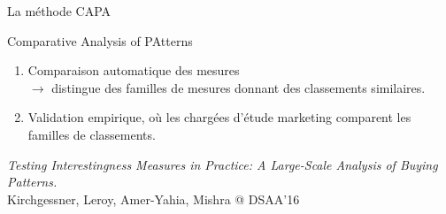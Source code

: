 \documentclass[table]{beamer}
\providecommand{\capa}{\mbox{\textsc{CAPA}} }
\begin{document}
\begin{frame}{La méthode \capa}
  \begin{block}{Comparative Analysis of PAtterns}
    \begin{enumerate}
      \item Comparaison automatique des mesures\\
      $\rightarrow$ distingue des familles de mesures donnant des classements similaires.
      \item Validation empirique, où les chargées d'étude marketing comparent les familles de classements.
    \end{enumerate}
  \end{block}
  \vfill
  \begin{footnotesize}
    {\em Testing Interestingness Measures in Practice: A Large-Scale Analysis of Buying Patterns.}\\
    Kirchgessner, Leroy, Amer-Yahia, Mishra @ DSAA'16
  \end{footnotesize}
\end{frame}
\end{document}
